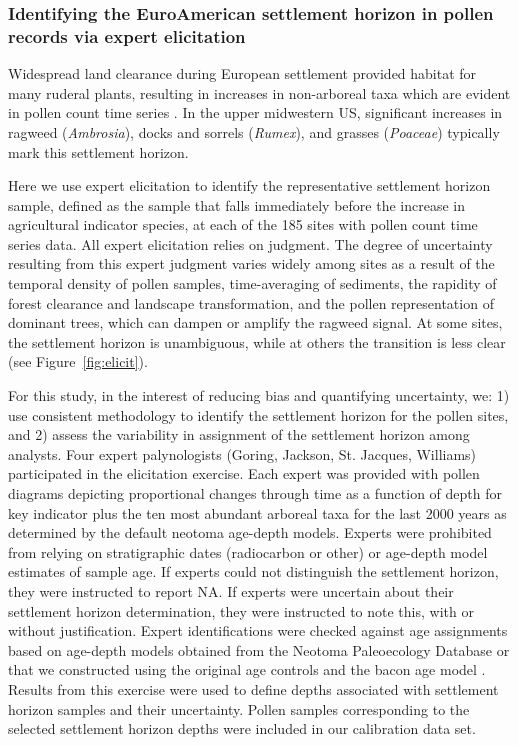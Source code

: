 \documentclass[12pt]{article}
\begin{document}
\subsubsection{Identifying the EuroAmerican settlement horizon in pollen records via expert elicitation}

Widespread land clearance during European settlement provided habitat
for many ruderal plants, resulting in increases in non-arboreal taxa
which are evident in pollen count time series
\citep{mcandrews1988human}. In the upper midwestern US, significant
increases in ragweed (\textit{Ambrosia}), docks and sorrels
(\textit{Rumex}), and grasses (\textit{Poaceae}) typically mark this
settlement horizon. 

Here we use expert elicitation to identify the representative
settlement horizon sample, defined as the sample that falls
immediately before the increase in agricultural indicator species, at
each of the 185 sites with pollen count time series data. All expert
elicitation relies on judgment. The degree of uncertainty resulting
from this expert judgment varies widely among sites as a result of the
temporal density of pollen samples, time-averaging of sediments, the
rapidity of forest clearance and landscape transformation, and the
pollen representation of dominant trees, which can dampen or amplify
the ragweed signal. At some sites, the settlement horizon is
unambiguous, while at others the transition is less clear (see
Figure~\ref{fig:elicit}).

For this study, in the interest of reducing bias and quantifying
uncertainty, we: 1) use consistent methodology to identify the
settlement horizon for the pollen sites, and 2) assess the variability
in assignment of the settlement horizon among analysts. Four expert
palynologists (Goring, Jackson, St. Jacques, Williams) participated in
the elicitation exercise. Each expert was provided with pollen
diagrams depicting proportional changes through time as a function of
depth for key indicator plus the ten most abundant arboreal taxa for
the last 2000 years as determined by the default neotoma age-depth
models. Experts were prohibited from relying on stratigraphic dates
(radiocarbon or other) or age-depth model estimates of sample age. If
experts could not distinguish the settlement horizon, they were
instructed to report NA. If experts were uncertain about their
settlement horizon determination, they were instructed to note this,
with or without justification. Expert identifications were checked
against age assignments based on age-depth models obtained from the
Neotoma Paleoecology Database or that we constructed using the
original age controls and the bacon age model
\citep{blaauw2011flexible}.  Results from this exercise were used to
define depths associated with settlement horizon samples and their
uncertainty. Pollen samples corresponding to the selected settlement
horizon depths were included in our calibration data set.
\end{document}
